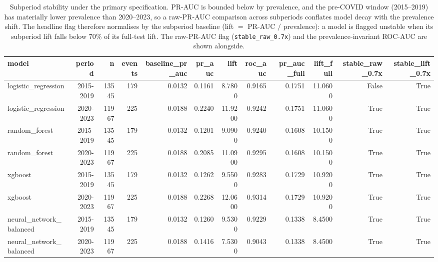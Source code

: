 \begin{table}[htbp]
\centering
\caption{Subperiod stability under the primary specification. PR-AUC is bounded below by prevalence, and the pre-COVID window (2015--2019) has materially lower prevalence than 2020--2023, so a raw-PR-AUC comparison across subperiods conflates model decay with the prevalence shift. The headline flag therefore normalises by the subperiod baseline (lift $=$ PR-AUC $/$ prevalence): a model is flagged unstable when its subperiod lift falls below 70\% of its full-test lift. The raw-PR-AUC flag (\texttt{stable\_raw\_0.7x}) and the prevalence-invariant ROC-AUC are shown alongside.}
\label{tab:v2_subperiod}
\small
\begin{tabular}{lrrrrrrrrrrr}
\toprule
model & period & n & events & baseline\_pr\_auc & pr\_auc & lift & roc\_auc & pr\_auc\_full & lift\_full & stable\_raw\_0.7x & stable\_lift\_0.7x \\
\midrule
logistic\_regression & 2015-2019 & 13545 & 179 & 0.0132 & 0.1161 & 8.7800 & 0.9165 & 0.1751 & 11.0600 & False & True \\
logistic\_regression & 2020-2023 & 11967 & 225 & 0.0188 & 0.2240 & 11.9200 & 0.9242 & 0.1751 & 11.0600 & True & True \\
random\_forest & 2015-2019 & 13545 & 179 & 0.0132 & 0.1201 & 9.0900 & 0.9240 & 0.1608 & 10.1500 & True & True \\
random\_forest & 2020-2023 & 11967 & 225 & 0.0188 & 0.2085 & 11.0900 & 0.9295 & 0.1608 & 10.1500 & True & True \\
xgboost & 2015-2019 & 13545 & 179 & 0.0132 & 0.1262 & 9.5500 & 0.9283 & 0.1729 & 10.9200 & True & True \\
xgboost & 2020-2023 & 11967 & 225 & 0.0188 & 0.2268 & 12.0600 & 0.9314 & 0.1729 & 10.9200 & True & True \\
neural\_network\_balanced & 2015-2019 & 13545 & 179 & 0.0132 & 0.1260 & 9.5300 & 0.9229 & 0.1338 & 8.4500 & True & True \\
neural\_network\_balanced & 2020-2023 & 11967 & 225 & 0.0188 & 0.1416 & 7.5300 & 0.9043 & 0.1338 & 8.4500 & True & True \\
\bottomrule
\end{tabular}
\end{table}
